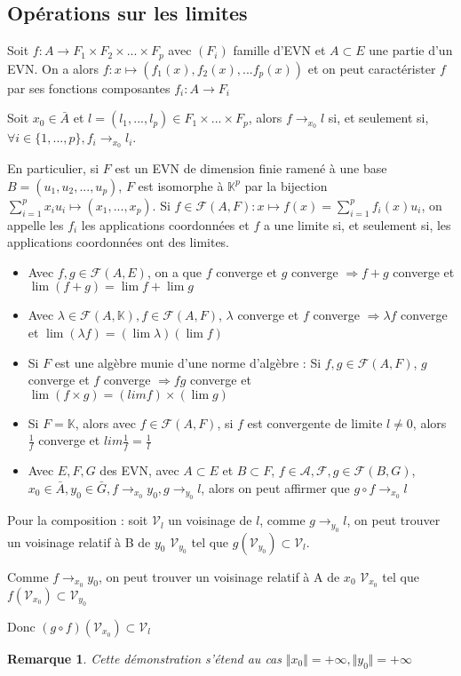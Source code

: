 \documentclass[a4paper,12pt]{book}
\newcommand{\Prop}[2]{\begin{tcolorbox}[sharp corners, colback=white,colframe=red!90!black!75, title=Proposition : #1]#2\end{tcolorbox}}
\newcommand{\Pre}[1]{\begin{tcolorbox}[sharp corners, colback=white,colframe=green!60!green!30!black!75, title=Preuve]#1\end{tcolorbox}}
\newtheorem{Rem}{Remarque}[section]
\def\K{\mathbb{K}}
\begin{document}
\subsection{Opérations sur les limites}
\Prop{Limite d'une fonction à valeurs dans un produit cartésien}{Soit $f:A\to F_1\times F_2\times...\times F_p$ avec $(F_i)$ famille d'EVN et $A\subset E$ une partie d'un EVN. On a alors $f:x\mapsto (f_1(x),f_2(x),... f_p(x))$ et on peut caractérister $f$ par ses fonctions composantes $f_i:A\to F_i$
\par Soit $x_0\in\bar{A}$ et $l=(l_1,...,l_p)\in F_1\times...\times F_p$, alors $f\to_{x_0} l$ si, et seulement si, $\forall i\in\{1,...,p\}, f_i\to_{x_0} l_i$.
\par En particulier, si $F$ est un EVN de dimension finie ramené à une base $B=(u_1, u_2,...,u_p)$, $F$ est isomorphe à $\K^p$ par la bijection $\sum\limits_{i=1}^px_iu_i\mapsto (x_1,...,x_p)$. Si $f\in\mathcal{F}(A,F) : x\mapsto f(x)=\sum\limits_{i=1}^pf_i(x)u_i$, on appelle les $f_i$ les applications coordonnées et $f$ a une limite si, et seulement si, les applications coordonnées ont des limites.}
\Prop{Opérations sur les fonctions convergentes}{\begin{itemize}
\item Avec $f,g\in\mathcal{F}(A,E)$, on a que $f$ converge et $g$ converge $\Rightarrow f+g$ converge et $\lim(f+g) = \lim f+\lim g$
\item Avec $\lambda\in\mathcal{F}(A,\K), f\in\mathcal{F}(A,F)$, $\lambda$ converge et $f$ converge $\Rightarrow \lambda f$ converge et $\lim(\lambda f) =(\lim\lambda)(\lim f)$
\item Si $F$ est une algèbre munie d'une norme d'algèbre : Si $f,g\in\mathcal{F}(A,F)$, $g$ converge et $f$ converge $\Rightarrow fg$ converge et $\lim (f\times g)=(lim f)\times(\lim g)$
\item Si $F=\K$, alors avec $f\in\mathcal{F}(A,F)$, si $f$ est convergente de limite $l\neq0$, alors $\frac{1}{f}$ converge et $lim\frac{1}{f}=\frac{1}{l}$
\item Avec $E,F,G$ des EVN, avec $A\subset E$ et $B\subset F$, $f\in\mathcal{A,F}, g\in\mathcal{F}(B,G)$, $x_0\in\bar{A}, y_0\in\bar{G}, f\to_{x_0} y_0, g\to_{y_0}l$, alors on peut affirmer que $g\circ f\to_{x_0} l$
\end{itemize}}
\Pre{Pour la composition : soit $\mathcal{V}_l$ un voisinage de $l$, comme $g\to_{y_0} l$, on peut trouver un voisinage relatif à B de $y_0$ $\mathcal{V}_{y_0}$ tel que $g(\mathcal{V}_{y_0})\subset\mathcal{V}_l$. \par Comme $f\to_{x_0}y_0$, on peut trouver un voisinage relatif à A de $x_0$ $\mathcal{V}_{x_0}$ tel que $f(\mathcal{V}_{x_0})\subset\mathcal{V}_{y_0}$ \par Donc $(g\circ f)(\mathcal{V}_{x_0})\subset\mathcal{V}_l$}
\begin{Rem}
Cette démonstration s'étend au cas $\Vert x_0\Vert=+\infty, \Vert y_0\Vert=+\infty$ 
\end{Rem}
\end{document}
